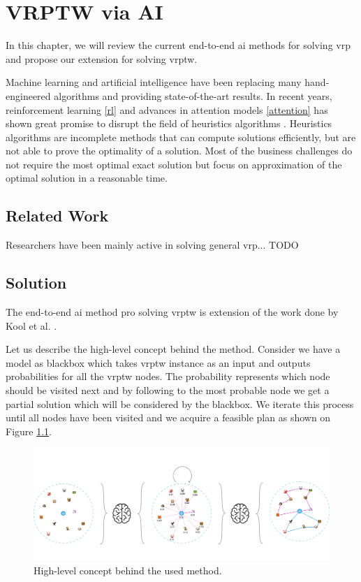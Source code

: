 \chapter{VRPTW via AI}
In this chapter, we will review the current end-to-end \gls{ai} methods for solving \gls{vrp} and propose our extension for solving \gls{vrptw}.

Machine learning and artificial intelligence have been replacing many hand-engineered algorithms and providing state-of-the-art results. In recent years, reinforcement learning \ref{rl} and advances in attention models \ref{attention} has shown great promise to disrupt the field of heuristics algorithms \cite{rl-constraint-opt, attention-route, dpdp}. Heuristics algorithms \cite{heuristics-algo} are incomplete methods that can compute solutions efficiently, but are not able to prove the optimality of a solution. Most of the business challenges do not require the most optimal exact solution \cite{excat-algo} but focus on approximation of the optimal solution in a reasonable time.

\section{Related Work}
Researchers have been mainly active in solving general \gls{vrp}...
TODO

\section{Solution}
The end-to-end \gls{ai} method pro solving \gls{vrptw} is extension of the work done by Kool et al. \cite{attention-route}. 

Let us describe the high-level concept behind the method. Consider we have a model as blackbox which takes \gls{vrptw} instance as an input and outputs probabilities for all the \gls{vrptw} nodes. The probability represents which node should be visited next and by following to the most probable node we get a partial solution which will be considered by the blackbox. We iterate this process until all nodes have been visited and we acquire a feasible plan as shown on Figure \ref{fig:attention-route-diagram}.

    \begin{figure}[ht]
        \centering
        \includegraphics[width=1.0\textwidth]{resources/vrptw-ai/attention-route-diagram.pdf}
        \caption{High-level concept behind the used method.}
        \label{fig:attention-route-diagram}
    \end{figure}

